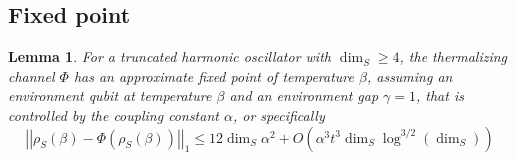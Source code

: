 \documentclass{article}
\newtheorem{lemma}[theorem]{Lemma}
\newcommand{\norm}[1]{\left| \left| #1 \right| \right|}
\newcommand{\bigo}[1]{O\left( #1 \right)}
\begin{document}
\subsection{Fixed point}
\begin{lemma}
    For a truncated harmonic oscillator with $\dim_S \geq 4$, the thermalizing channel $\Phi$ has an approximate fixed point of temperature $\beta$, assuming an environment qubit at temperature $\beta$ and an environment gap $\gamma = 1$, that is controlled by the coupling constant $\alpha$, or specifically
    \begin{equation}
        \norm{\rho_S(\beta) - \Phi(\rho_S(\beta))}_1 \le 12 \dim_S \alpha^2 + \bigo{\alpha^3 t^3 \dim_S \log^{3/2}(\dim_S)}
    \end{equation}
\end{lemma}
\end{document}
